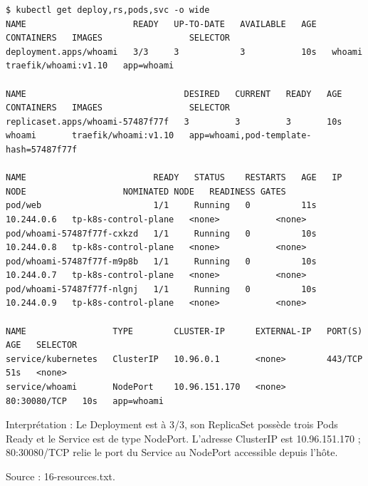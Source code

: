 \documentclass[11pt,a4paper]{article}
\begin{document}
\par\medskip\noindent\begin{minipage}{\linewidth}
\par\vspace{4pt}\noindent\begin{minipage}{\linewidth}
\begin{Verbatim}[breaklines=true,breakanywhere=true,fontsize=\footnotesize,frame=single,framesep=8pt,rulecolor=\color{teal}]
$ kubectl get deploy,rs,pods,svc -o wide
NAME                     READY   UP-TO-DATE   AVAILABLE   AGE   CONTAINERS   IMAGES                 SELECTOR
deployment.apps/whoami   3/3     3            3           10s   whoami       traefik/whoami:v1.10   app=whoami

NAME                               DESIRED   CURRENT   READY   AGE   CONTAINERS   IMAGES                 SELECTOR
replicaset.apps/whoami-57487f77f   3         3         3       10s   whoami       traefik/whoami:v1.10   app=whoami,pod-template-hash=57487f77f

NAME                         READY   STATUS    RESTARTS   AGE   IP           NODE                   NOMINATED NODE   READINESS GATES
pod/web                      1/1     Running   0          11s   10.244.0.6   tp-k8s-control-plane   <none>           <none>
pod/whoami-57487f77f-cxkzd   1/1     Running   0          10s   10.244.0.8   tp-k8s-control-plane   <none>           <none>
pod/whoami-57487f77f-m9p8b   1/1     Running   0          10s   10.244.0.7   tp-k8s-control-plane   <none>           <none>
pod/whoami-57487f77f-nlgnj   1/1     Running   0          10s   10.244.0.9   tp-k8s-control-plane   <none>           <none>

NAME                 TYPE        CLUSTER-IP      EXTERNAL-IP   PORT(S)        AGE   SELECTOR
service/kubernetes   ClusterIP   10.96.0.1       <none>        443/TCP        51s   <none>
service/whoami       NodePort    10.96.151.170   <none>        80:30080/TCP   10s   app=whoami
\end{Verbatim}
\end{minipage}\par\vspace{6pt}

Interprétation : Le Deployment est à 3/3, son ReplicaSet possède trois Pods Ready et le Service est de type NodePort. L'adresse ClusterIP est 10.96.151.170 ; 80:30080/TCP relie le port du Service au NodePort accessible depuis l'hôte.

{\footnotesize\color{teal} Source : 16-resources.txt.\par}
\end{minipage}\par\medskip
\end{document}
